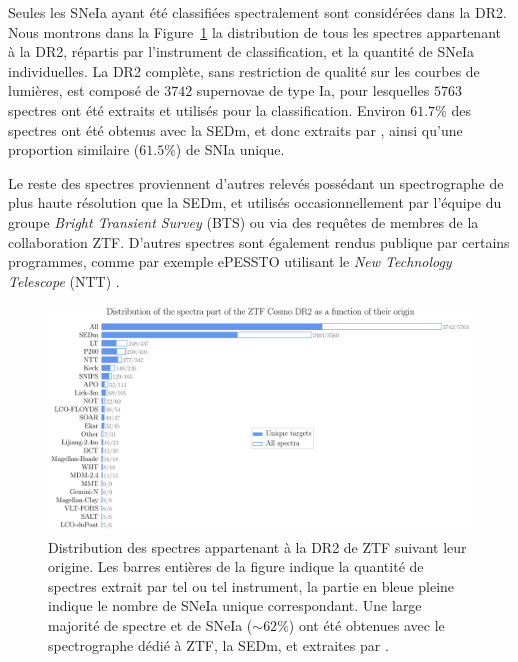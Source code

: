 \documentclass[../main/main.tex]{subfiles}
\begin{document}
Seules les SNeIa ayant été classifiées spectralement sont considérées
dans la DR2. Nous montrons dans la Figure~\ref{fig:specorigindr2} la
distribution de tous les spectres appartenant à la DR2, répartis par
l'instrument de classification, et la quantité de SNeIa individuelles.
La DR2 complète, sans restriction de qualité sur les courbes de
lumières, est composé de $3742$ supernovae de type Ia, pour lesquelles
$5763$ spectres ont été extraits et utilisés pour la classification.
Environ $61.7\%$ des spectres ont été obtenus avec la SEDm, et donc
extraits par \hypergal, ainsi qu'une proportion similaire ($61.5\%$) de SNIa
unique. 

Le reste des spectres proviennent d'autres relevés possédant un
spectrographe de plus haute résolution que la SEDm, et utilisés
occasionnellement par
l'équipe du groupe \textit{Bright Transient Survey} (BTS) ou via des
requêtes de membres de la collaboration ZTF. D'autres spectres sont
également rendus publique par certains programmes, comme par exemple
ePESSTO utilisant le \textit{New Technology Telescope} (NTT) \citep{Smartt2015}.

\begin{figure}[ht]
  \centering
  \includegraphics[width=1\textwidth]{../figures/09_dr2/spec_instorigin_dr2.pdf}
  \caption[Distribution des spectres appartenant à la DR2 de ZTF suivant
  leur origine.]{Distribution des spectres appartenant à la DR2 de ZTF suivant
  leur origine. Les barres entières de la figure indique la quantité de
  spectres extrait par tel ou tel instrument, la partie en bleue pleine
  indique le nombre de SNeIa unique correspondant. Une large majorité
  de spectre et de SNeIa ($\sim62\%$) ont été obtenues avec le spectrographe dédié à
  ZTF, la SEDm, et extraites par \hypergal. }
  \label{fig:specorigindr2}
\end{figure}
\end{document}
